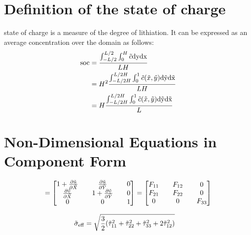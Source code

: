 \documentclass[../main.tex]{subfiles}
\begin{document}
\section{Definition of the state of charge}
state of charge is a measure of the degree of lithiation. It can be expressed as an average concentration over the domain as follows:
\begin{align}
    \rm{soc} &= \frac{\int_{-L/2}^{L/2} \int_0^H \tilde{c} \rm{d}y \rm{d}x}{L H} \\
         &= H^2\frac{\int_{-L/2H}^{L/2H} \int_0^1 \tilde{c}(\tilde{x}, \tilde{y}) \rm{d}\tilde{y} \rm{d}\tilde{x}}{L H} \\
         &= H\frac{\int_{-L/2H}^{L/2H} \int_0^1 \tilde{c}(\tilde{x}, \tilde{y}) \rm{d}\tilde{y} \rm{d}\tilde{x}}{L} 
\end{align}

\section{Non-Dimensional Equations in Component Form}
\begin{align}
[\F] = 
\begin{bmatrix}
       1 + \pdiff{\tu}{\tX} && \pdiff{\tu}{\tY} && 0 \\
       \pdiff{\tv}{\tX} && 1 + \pdiff{\tv}{\tY} && 0 \\
       0 && 0 && 1
\end{bmatrix} = \begin{bmatrix}
    F_{11} && F_{12}  && 0 \\
    F_{21} && F_{22}  && 0 \\
    0 && 0 && F_{33}
\end{bmatrix}
\end{align}
















\begin{align}
    \tilde{\sigma}_{\rm{eff}} &= \sqrt{\frac{3}{2}(\tilde{\tau}_{11}^2 + \tilde{\tau}_{22}^2 + \tilde{\tau}_{33}^2 + 2\tilde{\tau}_{12}^2) }
\end{align}
\end{document}
